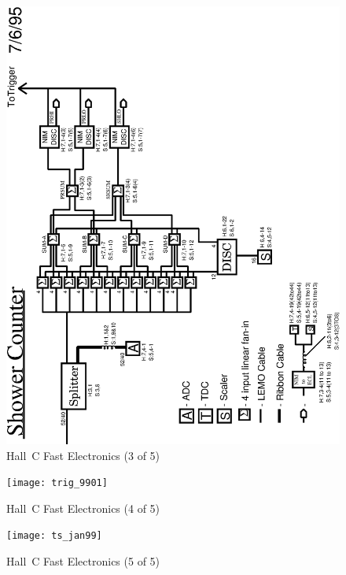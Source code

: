 \begin{figure}
\includegraphics[width=5.8in]{shower}
\caption{Hall~C Fast Electronics (3 of 5) \label{fig:shwr_logic}}
\end{figure}
\clearpage

\begin{figure}
\texttt{[image: trig\_9901]}
\caption{Hall~C Fast Electronics (4 of 5) \label{fig:trigger}}
\end{figure}
\clearpage

\begin{figure}
\texttt{[image: ts\_jan99]}
\caption{Hall~C Fast Electronics (5 of 5) \label{fig:ts_logic}}
\end{figure}
\clearpage

